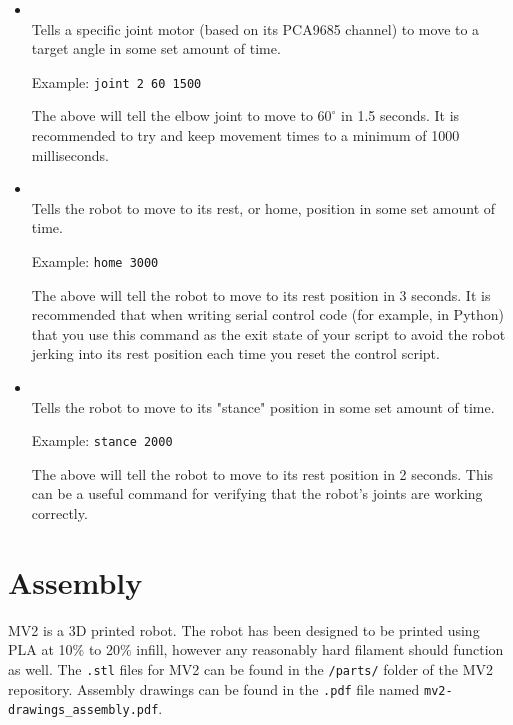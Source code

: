 \documentclass[a4paper,11pt]{article}
\begin{document}
\begin{itemize}
    \item {} \\
    
    Tells a specific joint motor (based on its PCA9685 channel) to move to a target angle in some set amount of time.
    
    Example: \texttt{joint 2 60 1500}
    
    The above will tell the elbow joint to move to $60^{\circ}$ in 1.5 seconds. It is recommended to try and keep movement times to a minimum of 1000 milliseconds.


    \item {} \\
    
    Tells the robot to move to its rest, or home, position in some set amount of time.
    
    Example: \texttt{home 3000}
    
    The above will tell the robot to move to its rest position in 3 seconds. It is recommended that when writing serial control code (for example, in Python) that you use this command as the exit state of your script to avoid the robot jerking into its rest position each time you reset the control script.


    \item {} \\
    
    Tells the robot to move to its "stance" position in some set amount of time.
    
    Example: \texttt{stance 2000}
    
    The above will tell the robot to move to its rest position in 2 seconds. This can be a useful command for verifying that the robot's joints are working correctly.
\end{itemize}


\section{Assembly}

MV2 is a 3D printed robot. The robot has been designed to be printed using PLA at 10\% to 20\% infill, however any reasonably hard filament should function as well. The \texttt{.stl} files for MV2 can be found in the \texttt{/parts/} folder of the MV2 repository. Assembly drawings can be found in the \texttt{.pdf} file named \texttt{mv2-drawings\_assembly.pdf}.
\end{document}
